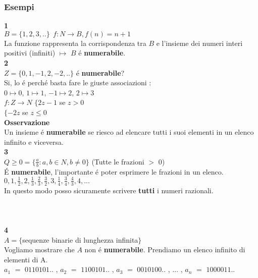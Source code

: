 \documentclass[11pt]{article}
\begin{document}
        \subsubsection{Esempi}
            \textbf{\large 1}\\
            $B=\{1,2,3,..\} \ \ f:N\to B , f(n)=n+1 $ \\
            La funzione rappresenta la corrispondenza tra $B$ e l'insieme dei numeri interi positivi (infiniti) $\mapsto$ $B$ \'e \textbf{numerabile}.\\
            \textbf{\large 2}\\
            $Z=\{0,1,-1,2,-2,..\}$ \'e \textbf{numerabile}? \\
            Si, lo \'e perch\'e basta fare le giuste associazioni : \\
            $0\mapsto 0 $, $1\mapsto1$, $-1\mapsto2$, $2\mapsto3$\\
            $f:Z\to N$ $\{2z-1 $ se $z>0$ \\
            \hspace*{1,8cm} $\{-2z  $ \hspace{0,35cm}se $z\leq0$  \\
            \textbf{Osservazione}\\
            Un insieme \'e \textbf{numerabile} se riesco ad elencare tutti i suoi elementi in un elenco infinito e viceversa.\\
            \textbf{3}\\
            $Q \geq 0 =\{\frac{a}{b}:a,b \in N , b\ne 0\}$ (Tutte le frazioni $>$ 0)\\
            \'E \textbf{numerabile}, l'importante \'e poter esprimere le frazioni in un elenco.\\
            $0,1,\frac{1}{2},2,\frac{1}{3},\frac{2}{3},\frac{3}{2},3,\frac{1}{4},\frac{3}{4},\frac{4}{3},4, ...$\\ In questo modo posso sicuramente scrivere \textbf{tutti} i numeri razionali.\\
            \\\\\\
            \textbf{\large 4}\\
            $A=\{$sequenze binarie di lunghezza infinita$\}$\\
            Vogliamo mostrare che $A$ non \'e \textbf{numerabile}. Prendiamo un elenco infinito di elementi di A.\\
            $a_{1}$ $=$ $0110101..$ , $a_{2}$ $=$ $1100101..$ , $a_{3}$ $=$ $0010100..$ , $...$ , $a_{n}$ $=$ $1000011..$\\
\end{document}
